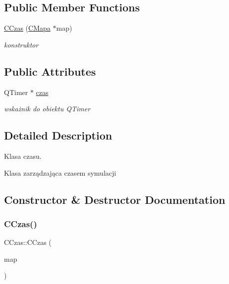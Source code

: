 \subsection*{Public Member Functions}
\begin{DoxyCompactItemize}
\item 
\mbox{\hyperlink{class_c_czas_abbc15f25b6a9941b659beb32e08456fb}{C\+Czas}} (\mbox{\hyperlink{class_c_mapa}{C\+Mapa}} $\ast$map)
\begin{DoxyCompactList}\small\item\em konstruktor \end{DoxyCompactList}\end{DoxyCompactItemize}
\subsection*{Public Attributes}
\begin{DoxyCompactItemize}
\item 
\mbox{\label{class_c_czas_a4b2b51aadfd05a9f629f4d55701c4f3e}} 
Q\+Timer $\ast$ \mbox{\hyperlink{class_c_czas_a4b2b51aadfd05a9f629f4d55701c4f3e}{czas}}
\begin{DoxyCompactList}\small\item\em wskażnik do obiektu Q\+Timer \end{DoxyCompactList}\end{DoxyCompactItemize}


\subsection{Detailed Description}
Klasa czasu. 

Klasa zarządzająca czasem symulacji 

\subsection{Constructor \& Destructor Documentation}
\mbox{\label{class_c_czas_abbc15f25b6a9941b659beb32e08456fb}} 
\subsubsection{\texorpdfstring{C\+Czas()}{CCzas()}}
{\footnotesize\ttfamily C\+Czas\+::\+C\+Czas (\begin{DoxyParamCaption}\item[{\mbox{\hyperlink{class_c_mapa}{C\+Mapa}} $\ast$}]{map }\end{DoxyParamCaption})}



